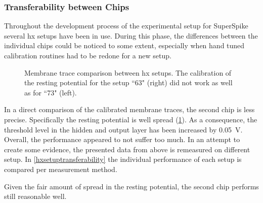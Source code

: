 \subsubsection*{Transferability between Chips}
Throughout the development process of the experimental setup for SuperSpike several \gls{hx} setups have been in use. During this phase, the differences between the individual chips could be noticed to some extent, especially when hand tuned calibration routines had to be redone for a new setup.
\begin{figure}[b!]
	\begin{subfigure}{0.5\textwidth}
		\centering
		
	\end{subfigure}
	\begin{subfigure}{0.5\textwidth}
		\centering
		
	\end{subfigure}
	\caption[Membrane trace comparison between \gls{hx} setups.]{Membrane trace comparison between \gls{hx} setups. The calibration of the resting potential for the setup ``63" (right) did not work as well as for ``73" (left).}
	\label{hxsetupmemtracescomparison}
\end{figure}
In a direct comparison of the calibrated membrane traces, the second chip is less precise. Specifically the resting potential is well spread (\cref{hxsetupmemtracescomparison}). As a consequence, the threshold level in the hidden and output layer has been increased by \SI{0.05}{V}. Overall, the performance appeared to not suffer too much. In an attempt to create some evidence, the presented data from above is remeasured on different setup. In \cref{hxsetuptransferability} the individual performance of each setup is compared per measurement method.

Given the fair amount of spread in the resting potential, the second chip performs still reasonable well.

